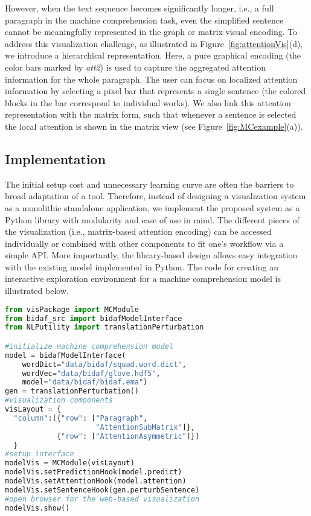 However, when the text sequence becomes significantly longer, i.e., a full paragraph in the machine comprehension task,  even the simplified sentence cannot be meaningfully represented in the graph or matrix visual encoding. To address this visualization challenge, as illustrated in Figure~\ref{fig:attentionVis}(d), we introduce a hierarchical representation. Here, a pure graphical encoding (the color bars marked by \emph{att2}) is used to capture the aggregated attention information for the whole paragraph. The user can focus on localized attention information by selecting a pixel bar that represents a single sentence (the colored blocks in the bar correspond to individual works). We also link this attention representation with the matrix form, such that whenever a sentence is selected the local attention is shown in the matrix view (see Figure~\ref{fig:MCexample}(a)).

\subsection{Implementation}
The initial setup cost and unnecessary learning curve are often the barriers to broad adaptation of a tool. 
Therefore, instead of designing a visualization system as a monolithic standalone application, 
we implement the proposed system as a Python library with modularity and ease of use in mind.
The different pieces of the visualization (i.e., matrix-based attention encoding) can be accessed individually or combined with other components to fit one's workflow via a simple API.
More importantly, the library-based design allows easy integration with the existing model implemented in Python.
The code for creating an interactive exploration environment for a machine comprehension model is illustrated below.

\begin{lstlisting}[language=Python, caption=Code for setting up the visualization system shown in Figure~\ref{fig:MCexample}(a).]
from visPackage import MCModule
from bidaf_src import bidafModelInterface
from NLPutility import translationPerturbation

#initialize machine comprehension model
model = bidafModelInterface(
    wordDict="data/bidaf/squad.word.dict",
    wordVec="data/bidaf/glove.hdf5",
    model="data/bidaf/bidaf.ema")
gen = translationPerturbation()
#visualization components
visLayout = {
  "column":[{"row": ["Paragraph", 
                     "AttentionSubMatrix"]},
            {"row": ["AttentionAsymmetric"]}]
  }
#setup interface
modelVis = MCModule(visLayout)
modelVis.setPredictionHook(model.predict)
modelVis.setAttentionHook(model.attention)
modelVis.setSentenceHook(gen.perturbSentence)
#open browser for the web-based visualization
modelVis.show()
\end{lstlisting}





